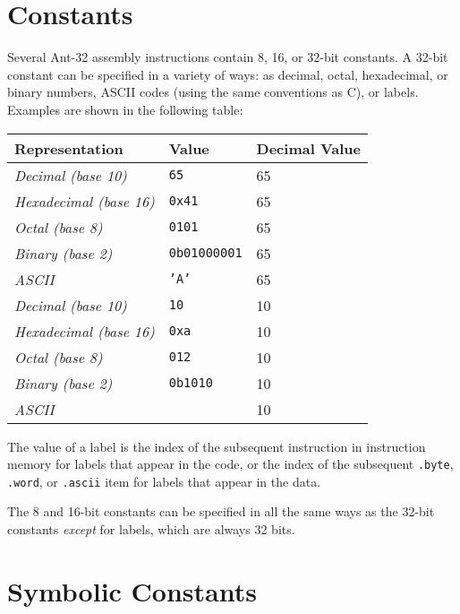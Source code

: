 
\section{Constants}
\label{data-const-sec}

Several Ant-32 assembly instructions contain 8, 16, or 32-bit constants.
A 32-bit constant can be specified in a variety of ways:
as decimal, octal, hexadecimal, or binary numbers, {\sc ASCII} codes (using
the same conventions as C), or labels.  Examples are shown in the
following table:

\begin{center}
\begin{tabular}{|l|l|l|}
\hline
Representation	& Value	& Decimal Value \\
\hline
{\em Decimal (base 10)}		&	{\tt 65}	&	65 \\
{\em Hexadecimal (base 16)}	&	{\tt 0x41}	&	65 \\
{\em Octal (base 8)}		&	{\tt 0101}	&	65 \\
{\em Binary (base 2)}		&	{\tt 0b01000001}&	65 \\
{\em {\sc ASCII}}		&	{\tt 'A'}	&	65 \\
\hline
{\em Decimal (base 10)}		&	{\tt 10}	&	10 \\
{\em Hexadecimal (base 16)}	&	{\tt 0xa}	&	10 \\
{\em Octal (base 8)}		&	{\tt 012}	&	10 \\
{\em Binary (base 2)}		&	{\tt 0b1010}	&	10 \\
{\em {\sc ASCII}}		&	{\tt '\verb$\$n'}	&	10 \\
\hline
\end{tabular}
\end{center}
\vspace{3mm}

The value of a label is the index of the subsequent instruction in
instruction memory for labels that appear in the code, or the index of
the subsequent {\tt .byte}, {\tt .word}, or {\tt .ascii} item for
labels that appear in the data.

The 8 and 16-bit constants can be specified in all the same ways as
the 32-bit constants {\em except} for labels, which are always 32
bits.

\section{Symbolic Constants}
\label{data-symconst-sec}

